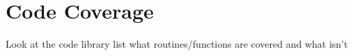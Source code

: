 
\chapter{Code Coverage} %

\label{Part9Chapter9} %


Look at the code library list what routines/functions are covered and what isn't